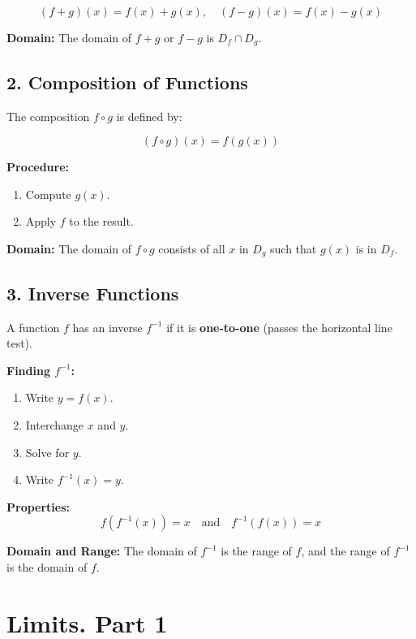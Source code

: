 \documentclass[../main-notes.tex]{subfile}
\begin{document}
\[
(f + g)(x) = f(x) + g(x), \quad (f - g)(x) = f(x) - g(x)
\]

\textbf{Domain:} The domain of \( f + g \) or \( f - g \) is \( D_f \cap D_g \).

\subsection*{2. Composition of Functions}
The composition \( f \circ g \) is defined by:

\[
(f \circ g)(x) = f(g(x))
\]

\textbf{Procedure:}
\begin{enumerate}
    \item Compute \( g(x) \).
    \item Apply \( f \) to the result.
\end{enumerate}

\textbf{Domain:} The domain of \( f \circ g \) consists of all \( x \) in \( D_g \) such that \( g(x) \) is in \( D_f \).

\subsection*{3. Inverse Functions}
A function \( f \) has an inverse \( f^{-1} \) if it is \textbf{one-to-one} (passes the horizontal line test).

\textbf{Finding \( f^{-1} \):}
\begin{enumerate}
    \item Write \( y = f(x) \).
    \item Interchange \( x \) and \( y \).
    \item Solve for \( y \).
    \item Write \( f^{-1}(x) = y \).
\end{enumerate}

\textbf{Properties:}
\[
f(f^{-1}(x)) = x \quad \text{and} \quad f^{-1}(f(x)) = x
\]

\textbf{Domain and Range:}
The domain of \( f^{-1} \) is the range of \( f \), and the range of \( f^{-1} \) is the domain of \( f \).




\newpage
\section{Limits. Part 1}

\end{document}
